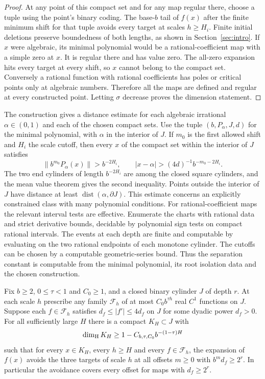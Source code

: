 \begin{proof}
At any point of this compact set and for any map regular there, choose a tuple using the point's binary coding. The base-$b$ tail of $f(x)$ after the finite minimum shift for that tuple avoids every target at scales $h\ge H_i$. Finite initial deletions preserve boundedness of both lengths, as shown in Section~\ref{sec:intro}. If $x$ were algebraic, its minimal polynomial would be a rational-coefficient map with a simple zero at $x$. It is regular there and has value zero. The all-zero expansion hits every target at every shift, so $x$ cannot belong to the compact set. Conversely a rational function with rational coefficients has poles or critical points only at algebraic numbers. Therefore all the maps are defined and regular at every constructed point. Letting $\sigma$ decrease proves the dimension statement.
\end{proof}

The construction gives a distance estimate for each algebraic irrational $\alpha\in(0,1)$ and each of the chosen compact sets. Use the tuple $(b,P_\alpha,J,d)$ for the minimal polynomial, with $\alpha$ in the interior of $J$. If $m_0$ is the first allowed shift and $H_i$ the scale cutoff, then every $x$ of the compact set within the interior of $J$ satisfies
\[
 \|b^{m_0}P_\alpha(x)\|>b^{-2H_i},
 \qquad
 |x-\alpha|> (4d)^{-1}b^{-m_0-2H_i}.
\]
The two end cylinders of length $b^{-2H_i}$ are among the closed square cylinders, and the mean value theorem gives the second inequality. Points outside the interior of $J$ have distance at least $\operatorname{dist}(\alpha,\partial J)$. This estimate concerns an explicitly constrained class with many polynomial conditions. For rational-coefficient maps the relevant interval tests are effective. Enumerate the charts with rational data and strict derivative bounds, decidable by polynomial sign tests on compact rational intervals. The events at each depth are finite and computable by evaluating on the two rational endpoints of each monotone cylinder. The cutoffs can be chosen by a computable geometric-series bound. Thus the separation constant is computable from the minimal polynomial, its root isolation data and the chosen construction.


\begin{theorem}\label{thm:moving-maps}
Fix $b\ge2$, $0\le\tau<1$ and $C_0\ge1$, and a closed binary cylinder $J$ of depth $r$. At each scale $h$ prescribe any family $\mathcal F_h$ of at most $C_0 b^{\tau h}$ real $C^1$ functions on $J$. Suppose each $f\in\mathcal F_h$ satisfies $d_f\le|f'|\le4d_f$ on $J$ for some dyadic power $d_f>0$. For all sufficiently large $H$ there is a compact $K_H\subset J$ with
\[
           \dim_{\rm H}K_H\ge 1-C_{b,\tau,C_0}b^{-(1-\tau)H}
\]
such that for every $x\in K_H$, every $h\ge H$ and every $f\in\mathcal F_h$, the expansion of $f(x)$ avoids the three targets of scale $h$ at all offsets $m\ge0$ with $b^m d_f\ge2^r$. In particular the avoidance covers every offset for maps with $d_f\ge2^r$.
\end{theorem}

